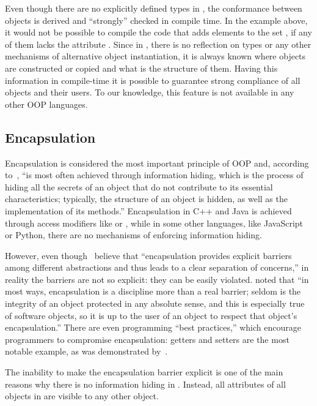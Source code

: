 Even though there are no explicitly defined types in \phic{},
the conformance between objects is derived and ``strongly'' checked
in compile time. In the example above, it would not be possible to
compile the code that adds elements to the set , if any
of them lacks the attribute . Since in \eolang{},
there is no reflection on types or any other mechanisms
of alternative object instantiation, it is always known where
objects are constructed or copied and what is the structure of them.
Having this information in compile-time it is possible to guarantee
strong compliance of all objects and their users. To our knowledge,
this feature is not available in any other OOP languages.

\subsection{Encapsulation}

Encapsulation is considered the most important principle of OOP
and, according to~\citet[p.51]{grady2007object},
``is most often achieved through information hiding,
which is the process of hiding all the secrets of an object
that do not contribute to its essential characteristics;
typically, the structure of an object is hidden, as well
as the implementation of its methods.'' Encapsulation in C++ and
Java is achieved through access modifiers like  or
, while in some other languages, like JavaScript or Python,
there are no mechanisms of enforcing information hiding.

However, even though~\citet[p.51]{grady2007object} believe that
``encapsulation provides explicit barriers among different
abstractions and thus leads to a clear separation of concerns,''
in reality the barriers are not so explicit: they can be easily
violated.
\citet[p.141]{west2004object} noted that
``in most ways, encapsulation is a discipline more than a real barrier;
seldom is the integrity of an object protected in any absolute
sense, and this is especially true of software objects,
so it is up to the user of an object to respect that object's encapsulation.''
There are even programming ``best practices,'' which encourage
programmers to compromise encapsulation: getters and setters are
the most notable example, as was demonstrated by~\citet{holub2004more}.

The inability to make the encapsulation barrier explicit
is one of the main reasons why there is no information hiding in \phic{}.
Instead, all attributes of all objects in \phic{}
are visible to any other object.

